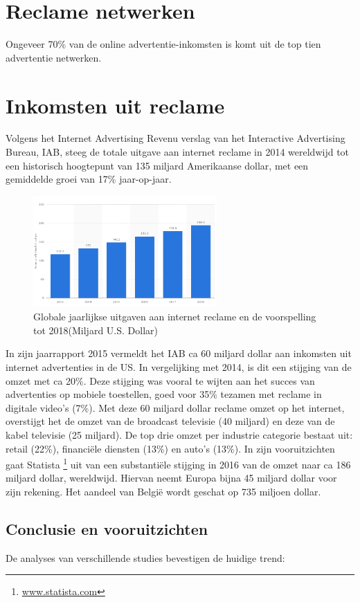 \documentclass[pdftex,a4paper,12pt,twoside]{report}
\begin{document}
\section{Reclame netwerken}
\label{sec:Reclame netwerken}
Ongeveer 70\% van de online advertentie-inkomsten is komt uit de top tien advertentie netwerken.

\section{Inkomsten uit reclame}
\label{sec:Inkomsten uit reclame}
Volgens het Internet Advertising Revenu verslag \cite{Silverman2015} van het Interactive Advertising Bureau, IAB, steeg de totale uitgave aan internet reclame in 2014 wereldwijd tot een historisch hoogtepunt van 135 miljard Amerikaanse dollar, met een gemiddelde groei van 17\% jaar-op-jaar.
\begin{figure}[h!]
\centering
\includegraphics[width=7cm]{img/AdvertisingRevenueYearly}
\caption{Globale jaarlijkse uitgaven aan internet reclame en de voorspelling tot 2018(Miljard U.S. Dollar)}
\label{fig: AdvertisingRevenueYearly}
\end{figure} 
In zijn jaarrapport 2015 vermeldt het IAB ca 60 miljard dollar aan inkomsten uit internet advertenties in de US. In vergelijking met 2014, is dit een stijging van de omzet met ca 20\%. Deze stijging was vooral te wijten aan het succes van advertenties op mobiele toestellen, goed voor 35\% tezamen met reclame in digitale video’s (7\%). 
Met deze 60 miljard dollar reclame omzet op het internet, overstijgt het de omzet van de broadcast televisie (40 miljard) en deze van de kabel televisie (25 miljard).
De top drie omzet per industrie categorie bestaat uit: retail (22\%), financiële diensten (13\%) en auto’s (13\%). 
In zijn vooruitzichten gaat Statista \footnote{\url{www.statista.com}} uit van een substantiële stijging in 2016 van de omzet naar ca 186 miljard dollar, wereldwijd. Hiervan neemt Europa bijna 45 miljard dollar voor zijn rekening. Het aandeel van België wordt geschat op 735 miljoen dollar.

\subsection{Conclusie en vooruitzichten }
\label{Conclusie en vooruitzichten }
De analyses van verschillende studies \citep{Silverman2015,BI-Insider2016, EMarketer2016, pwc2015} bevestigen de huidige trend:
\end{document}
